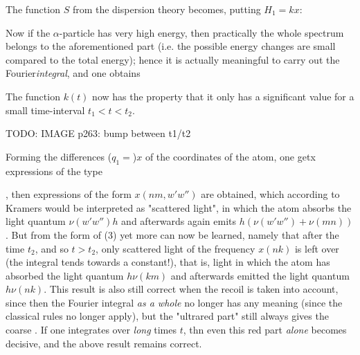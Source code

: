 The function $S$ from the dispersion theory becomes, putting $H_1 = kx$:

Now if the $\alpha$-particle has very high energy, then practically the whole spectrum belongs to the aforementioned  part (i.e. the possible energy changes are small compared to the total energy); hence it is actually meaningful to carry out the Fourier\textit{integral}, and one obtains

The function $k(t)$ now has the property that it only has a significant value for a small time-interval $t_1 < t < t_2$.

TODO: IMAGE p263: bump between t1/t2

Forming the differences ($q_1=$)$x$ of the coordinates of the atom, one getx expressions of the type

, then expressions of the form $x(nm, w'w'')$ are obtained, which according to Kramers would be interpreted as "scattered light", in which the atom absorbs the light quantum $\nu(w'w'')h$ and afterwards again emits $h\left(\nu(w'w'')+\nu(mn)\right)$. But from the form of (3) yet more can now be learned, namely that after the time $t_2$, and so $t > t_2$, only scattered light of the frequency $x(nk)$ is left over (the integral tends towards a constant!), that is, light in which the atom has absorbed the light quantum $h\nu(km)$ and afterwards emitted the light quantum $h\nu(nk)$. This result is also still correct when the recoil is taken into account, since then the Fourier integral \textit{as a whole} no longer has any meaning (since the classical rules no longer apply), but the "ultrared part" still always gives the coarse . If one integrates over \textit{long} times $t$, thn even this red part \textit{alone} becomes decisive, and the above result remains correct.

